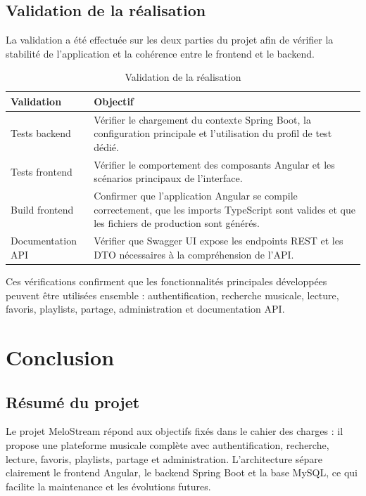 \documentclass[12pt,a4paper]{report}
\newcommand{\projectName}{MeloStream}
\newcommand{\tableHeader}{\rowcolor{primary!12}}
\begin{document}
\section{Validation de la réalisation}

La validation a été effectuée sur les deux parties du projet afin de vérifier la
stabilité de l'application et la cohérence entre le frontend et le backend.

\begin{longtable}{|p{4cm}|p{9.6cm}|}
\caption{Validation de la réalisation} \\
\hline
\tableHeader \textbf{Validation} & \textbf{Objectif} \\
\hline
Tests backend & Vérifier le chargement du contexte Spring Boot, la configuration
principale et l'utilisation du profil de test dédié. \\
\hline
Tests frontend & Vérifier le comportement des composants Angular et les scénarios
principaux de l'interface. \\
\hline
Build frontend & Confirmer que l'application Angular se compile correctement, que
les imports TypeScript sont valides et que les fichiers de production sont générés. \\
\hline
Documentation API & Vérifier que Swagger UI expose les endpoints REST et les DTO
nécessaires à la compréhension de l'API. \\
\hline
\end{longtable}

Ces vérifications confirment que les fonctionnalités principales développées
peuvent être utilisées ensemble : authentification, recherche musicale, lecture,
favoris, playlists, partage, administration et documentation API.


\chapter*{Conclusion}

\section*{Résumé du projet}

Le projet \projectName{} répond aux objectifs fixés dans le cahier des charges :
il propose une plateforme musicale complète avec authentification, recherche,
lecture, favoris, playlists, partage et administration. L'architecture sépare
clairement le frontend Angular, le backend Spring Boot et la base MySQL, ce qui
facilite la maintenance et les évolutions futures.
\end{document}
